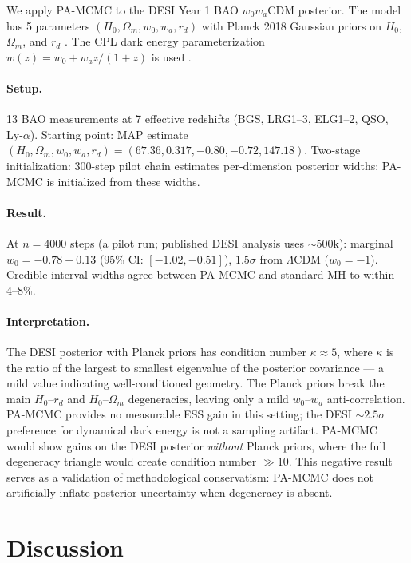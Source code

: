 \documentclass[11pt]{article}
\theoremstyle{definition}
\begin{document}
We apply PA-MCMC to the DESI Year 1 BAO \cite{desi2024bao} $w_0 w_a$CDM posterior.
The model has 5 parameters $(H_0, \Omega_m, w_0, w_a, r_d)$ with
Planck 2018 Gaussian priors on $H_0$, $\Omega_m$, and $r_d$ \cite{planck2020parameters}.
The CPL dark energy parameterization $w(z) = w_0 + w_a z/(1+z)$ is used
\cite{chevallier2001accelerating,linder2003exploring}.

\paragraph{Setup.}
13 BAO measurements at 7 effective redshifts (BGS, LRG1--3, ELG1--2, QSO,
Ly-$\alpha$).
Starting point: MAP estimate $(H_0, \Omega_m, w_0, w_a, r_d) = (67.36, 0.317, -0.80, -0.72, 147.18)$.
Two-stage initialization: 300-step pilot chain estimates per-dimension posterior
widths; PA-MCMC is initialized from these widths.

\paragraph{Result.}
At $n = 4000$ steps (a pilot run; published DESI analysis uses ${\sim}500\text{k}$):
marginal $w_0 = -0.78 \pm 0.13$ (95\% CI: $[-1.02, -0.51]$), $1.5\sigma$ from
$\Lambda$CDM ($w_0 = -1$).
Credible interval widths agree between PA-MCMC and standard MH to within 4--8\%.

\paragraph{Interpretation.}
The DESI posterior with Planck priors has condition number $\kappa \approx 5$,
where $\kappa$ is the ratio of the largest to smallest eigenvalue of the
posterior covariance — a mild value indicating well-conditioned geometry.
The Planck priors break the main $H_0$--$r_d$ and $H_0$--$\Omega_m$ degeneracies,
leaving only a mild $w_0$--$w_a$ anti-correlation.
PA-MCMC provides no measurable ESS gain in this setting; the DESI ${\sim}2.5\sigma$
preference for dynamical dark energy is not a sampling artifact.
PA-MCMC would show gains on the DESI posterior \emph{without} Planck priors,
where the full degeneracy triangle would create condition number ${\gg}10$.
This negative result serves as a validation of methodological conservatism:
PA-MCMC does not artificially inflate posterior uncertainty when degeneracy
is absent.

\section{Discussion}
\end{document}
